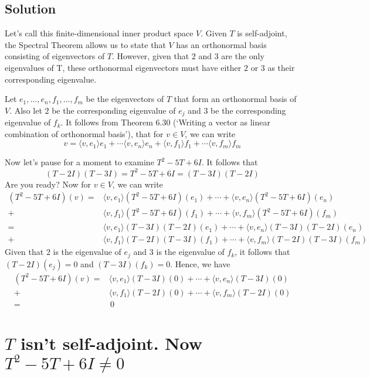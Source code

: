 \documentclass{article}
\begin{document}
\subsection*{Solution}
Let's call this finite-dimensional inner product space $V$. Given $T$ is self-adjoint, the Spectral Theorem allows us to state that $V$ has an orthonormal basis consisting of eigenvectors of $T$. However, given that $2$ and $3$ are the only eigenvalues of T, these orthonormal eigenvectors must have either $2$ or $3$ as their corresponding eigenvalue.

Let $e_1,\ldots,e_n,f_1,\ldots,f_m$ be the eigenvectors of $T$ that form an orthonormal basis of $V$. Also let $2$ be the corresponding eigenvalue of $e_j$ and $3$ be the corresponding eigenvalue of $f_k$. It follows from Theorem 6.30 (`Writing a vector as linear combination of orthonormal basis'), that for $v\in V$, we can write
\[v=\langle v,e_1\rangle e_1 + \cdots \langle v,e_n\rangle e_n + \langle v,f_1\rangle f_1 + \cdots \langle v,f_m\rangle f_m \]

Now let's pause for a moment to examine $T^2-5T+6I$. It follows that 
\[(T-2I)(T-3I)=T^2-5T+6I=(T-3I)(T-2I)\]
Are you ready? Now for $v\in V$, we can write
\begin{align*}
    (T^2-5T+6I)(v) = &\langle v,e_1\rangle(T^2-5T+6I) (e_1) + \cdots + \langle v,e_n\rangle (T^2-5T+6I)(e_n)\\
    + &\langle v,f_1\rangle(T^2-5T+6I) (f_1) + \cdots + \langle v,f_m\rangle(T^2-5T+6I) (f_m) \\
    = &\langle v,e_1\rangle(T-3I)(T-2I)(e_1) + \cdots + \langle v,e_n\rangle (T-3I)(T-2I)(e_n)\\
    + &\langle v,f_1\rangle(T-2I)(T-3I)(f_1) + \cdots + \langle v,f_m\rangle(T-2I)(T-3I)(f_m)
\end{align*}
Given that $2$ is the eigenvalue of $e_j$ and $3$ is the eigenvalue of $f_k$, it follows that $(T-2I)(e_j)=0$ and $(T-3I)(f_k)=0$. Hence, we have
\begin{align*}
    (T^2-5T+6I)(v) = &\langle v,e_1\rangle(T-3I)(0) + \cdots + \langle v,e_n\rangle (T-3I)(0)\\
    + &\langle v,f_1\rangle(T-2I)(0) + \cdots + \langle v,f_m\rangle(T-2I)(0) \\
    = &\, 0
\end{align*}

\clearpage

\section{$T$ isn't self-adjoint. Now $T^2-5T+6I\neq 0$}
\end{document}
